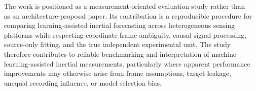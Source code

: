 \documentclass[12pt,a4paper]{article}
\begin{document}
The work is positioned as a measurement-oriented evaluation study rather than as an architecture-proposal paper. Its contribution is a reproducible procedure for comparing learning-assisted inertial forecasting across heterogeneous sensing platforms while respecting coordinate-frame ambiguity, causal signal processing, source-only fitting, and the true independent experimental unit. The study therefore contributes to reliable benchmarking and interpretation of machine-learning-assisted inertial measurements, particularly where apparent performance improvements may otherwise arise from frame assumptions, target leakage, unequal recording influence, or model-selection bias.
\end{document}
